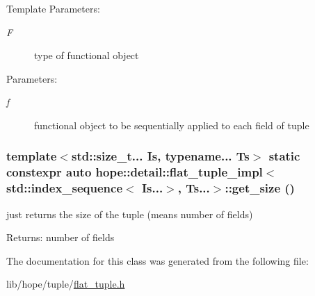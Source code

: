 \begin{Desc}
\item[Template Parameters:]
\begin{description}
\item[{\em F}]type of functional object \end{description}
\end{Desc}
\begin{Desc}
\item[Parameters:]
\begin{description}
\item[{\em f}]functional object to be sequentially applied to each field of tuple \end{description}
\end{Desc}
\hypertarget{classhope_1_1detail_1_1flat__tuple__impl_3_01std_1_1index__sequence_3_01_is_8_8_8_4_00_01_ts_8_8_8_4_e8c18d2b32dc3aee7818265152bbfa46}{
\subsubsection[{get\_\-size}]{\setlength{\rightskip}{0pt plus 5cm}template$<$std::size\_\-t... Is, typename... Ts$>$ static constexpr auto hope::detail::flat\_\-tuple\_\-impl$<$ std::index\_\-sequence$<$ Is...$>$, Ts...$>$::get\_\-size ()}}
\label{classhope_1_1detail_1_1flat__tuple__impl_3_01std_1_1index__sequence_3_01_is_8_8_8_4_00_01_ts_8_8_8_4_e8c18d2b32dc3aee7818265152bbfa46}


just returns the size of the tuple (means number of fields) 

\begin{Desc}
\item[Returns:]number of fields \end{Desc}


The documentation for this class was generated from the following file:\begin{CompactItemize}
\item 
lib/hope/tuple/\hyperlink{flat__tuple_8h}{flat\_\-tuple.h}\end{CompactItemize}
